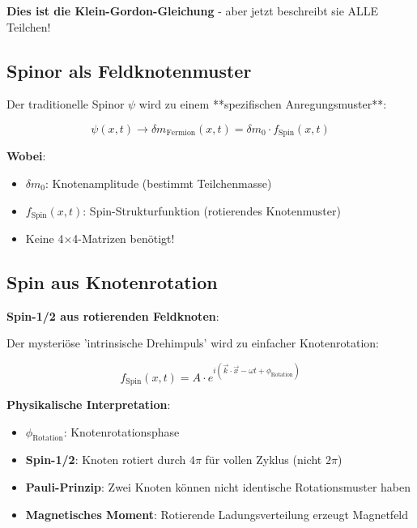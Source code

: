 \documentclass[12pt,a4paper]{article}
\newcommand{\deltam}{\delta m}
\theoremstyle{definition}
\theoremstyle{remark}
\begin{document}
	\textbf{Dies ist die Klein-Gordon-Gleichung} - aber jetzt beschreibt sie ALLE Teilchen!
	
	\subsection{Spinor als Feldknotenmuster}
	
	Der traditionelle Spinor $\psi$ wird zu einem **spezifischen Anregungsmuster**:
	
	\begin{equation}
		\psi(x,t) \rightarrow \deltam_{\text{Fermion}}(x,t) = \deltam_0 \cdot f_{\text{Spin}}(x,t)
		\label{eq:spinor_to_node}
	\end{equation}
	
	\textbf{Wobei}:
	\begin{itemize}
		\item $\deltam_0$: Knotenamplitude (bestimmt Teilchenmasse)
		\item $f_{\text{Spin}}(x,t)$: Spin-Strukturfunktion (rotierendes Knotenmuster)
		\item Keine 4×4-Matrizen benötigt!
	\end{itemize}
	
	\subsection{Spin aus Knotenrotation}
	
	\textbf{Spin-1/2 aus rotierenden Feldknoten}:
	
	Der mysteriöse 'intrinsische Drehimpuls' wird zu einfacher Knotenrotation:
	
	\begin{equation}
		f_{\text{Spin}}(x,t) = A \cdot e^{i(\vec{k} \cdot \vec{x} - \omega t + \phi_{\text{Rotation}})}
		\label{eq:rotating_node}
	\end{equation}
	
	\textbf{Physikalische Interpretation}:
	\begin{itemize}
		\item \textbf{$\phi_{\text{Rotation}}$}: Knotenrotationsphase
		\item \textbf{Spin-1/2}: Knoten rotiert durch $4\pi$ für vollen Zyklus (nicht $2\pi$)
		\item \textbf{Pauli-Prinzip}: Zwei Knoten können nicht identische Rotationsmuster haben
		\item \textbf{Magnetisches Moment}: Rotierende Ladungsverteilung erzeugt Magnetfeld
	\end{itemize}
	
\end{document}
